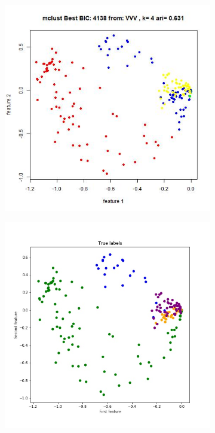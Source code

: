 \documentclass{article}
\begin{document}
\begin{figure}[h!]
\begin{subfigure}[b]{0.3\linewidth}
  \includegraphics[width=\linewidth]{r_bic_k4.jpg}
\end{subfigure}
\begin{subfigure}[b]{0.3\linewidth}
  \includegraphics[width=\linewidth]{true.jpg}

\end{subfigure}
\end{figure}
\end{document}
